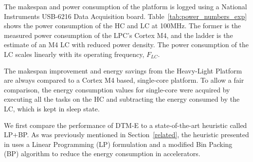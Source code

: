 The makespan and power consumption of the platform is logged using a National Instruments USB-6216 Data Acquisition board. Table~\ref{tab:power_numbers_exp} shows the power consumption of the HC and LC at 100MHz. The former is the measured power consumption of the LPC's Cortex M4, and the ladder is the estimate of an M4 LC with reduced power density. The power consumption of the LC scales linearly with its operating frequency, $F_{LC}$.

The makespan improvement and energy savings from the Heavy-Light Platform are always compared to a Cortex M4 based, single-core platform. 
To allow a fair comparison, the energy consumption values for single-core were acquired by executing all the tasks on the HC and subtracting the energy consumed by the LC, which is kept in sleep state.


We first compare the performance of DTM-E to a state-of-the-art heuristic called LP+BP. As was previously mentioned in Section~\ref{related}, the heuristic presented in \cite{Paterna} uses a Linear Programming (LP) formulation and a modified Bin Packing (BP) algorithm to reduce the energy consumption in accelerators. %


